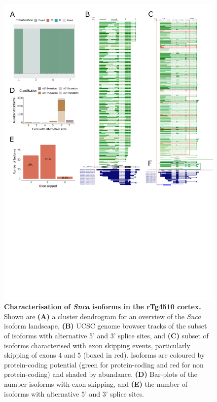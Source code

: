 \begin{figure}[htp]
	\centering
	\includegraphics[page=7,trim={0 10cm 0 0},scale = 0.85]{Figures/TargetGenes_Annotation_Portrait.pdf}
	\captionsetup{width=0.95\textwidth}
	\caption[Characterisation of the \textit{Snca} isoform landscape]%
	{\textbf{Characterisation of \textit{Snca} isoforms in the rTg4510 cortex.} Shown are \textbf{(A)} a cluster dendrogram for an overview of the \textit{Snca} isoform landscape, \textbf{(B)} UCSC genome browser tracks of the subset of isoforms with alternative 5' and 3' splice sites, and \textbf{(C)} subset of isoforms characterised with exon skipping events, particularly skipping of exons 4 and 5 (boxed in red). Isoforms are coloured by protein-coding potential (green for protein-coding and red for non protein-coding) and shaded by abundance. \textbf{(D)} Bar-plots of the number isoforms with exon skipping, and \textbf{(E)} the number of isoforms with alternative 5' and 3' splice sites.}    
	\label{fig:snca}
\end{figure}
\restoregeometry


